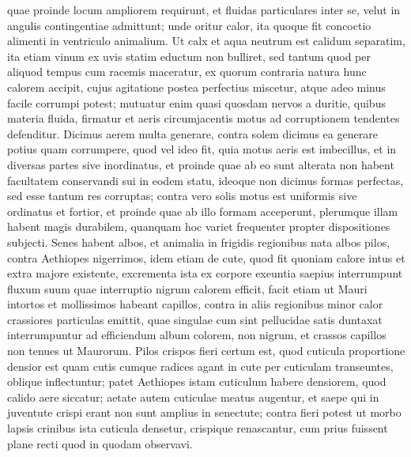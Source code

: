 quae proinde locum ampliorem requirunt, et fluidas particulares inter se, velut in angulis contingentiae admittunt; unde oritur calor, ita quoque fit concoctio alimenti in ventriculo animalium. Ut calx et aqua neutrum est calidum separatim, ita etiam vinum ex uvis statim eductum non bulliret, sed tantum quod per aliquod tempus cum racemis maceratur, ex quorum contraria natura hunc calorem accipit, cujus agitatione postea perfectius miscetur, atque adeo minus facile corrumpi potest; mutuatur enim quasi quosdam nervos a
duritie, quibus materia fluida, firmatur et
aeris circumjacentis motus ad corruptionem tendentes defenditur.
\pend%
\pstart%
Dicimus aerem multa
generare, contra solem dicimus ea generare potius quam corrumpere, quod vel ideo fit, quia motus aeris est imbecillus, et in diversas partes sive inordinatus, et proinde quae ab eo sunt alterata non habent facultatem conservandi sui in eodem statu, ideoque non dicimus
formas perfectas, sed esse tantum res corruptas; contra vero solis motus est uniformis sive ordinatus et fortior, et proinde quae ab illo formam acceperunt, plerumque illam habent magis durabilem, quanquam hoc variet frequenter propter dispositiones subjecti.
\pend%
\pstart%
Senes habent  albos, et animalia in frigidis regionibus nata albos pilos, contra Aethiopes nigerrimos, idem etiam de cute, quod fit quoniam calore intus et extra majore existente, excrementa ista ex corpore exeuntia saepius interrumpunt fluxum suum quae interruptio nigrum calorem efficit, facit etiam ut Mauri intortos et mollissimos habeant capillos, contra in aliis regionibus minor calor crassiores particulas emittit, quae singulae cum sint pellucidae satis duntaxat interrumpuntur ad efficiendum album colorem, non nigrum, et crassos capillos non tenues ut Maurorum.
\pend%
\pstart%
Pilos crispos fieri certum est, quod cuticula proportione densior est quam cutis cumque radices agant in cute per cuticulam transeuntes, oblique inflectuntur; patet Aethiopes istam cuticulum habere densiorem, quod calido aere siccatur; aetate autem cuticulae meatus augentur, et saepe qui in juventute crispi erant non sunt amplius in senectute; contra fieri potest ut morbo lapsis crinibus ista cuticula densetur, crispique renascantur, cum prius fuissent plane recti quod in quodam observavi.
